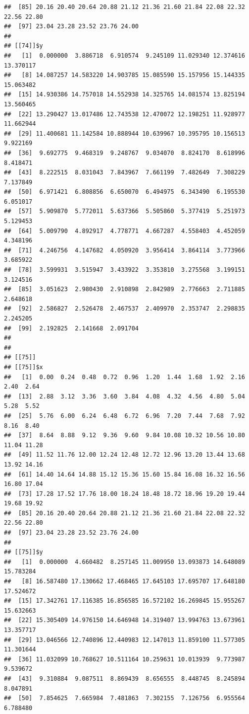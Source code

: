 \documentclass[
  ignorenonframetext,
]{beamer}
\begin{document}
\begin{frame}[fragile]{}
\begin{verbatim}
##  [85] 20.16 20.40 20.64 20.88 21.12 21.36 21.60 21.84 22.08 22.32 22.56 22.80
##  [97] 23.04 23.28 23.52 23.76 24.00
## 
## [[74]]$y
##   [1]  0.000000  3.886718  6.910574  9.245109 11.029340 12.374616 13.370117
##   [8] 14.087257 14.583220 14.903785 15.085590 15.157956 15.144335 15.063482
##  [15] 14.930386 14.757018 14.552938 14.325765 14.081574 13.825194 13.560465
##  [22] 13.290427 13.017486 12.743538 12.470072 12.198251 11.928977 11.662944
##  [29] 11.400681 11.142584 10.888944 10.639967 10.395795 10.156513  9.922169
##  [36]  9.692775  9.468319  9.248767  9.034070  8.824170  8.618996  8.418471
##  [43]  8.222515  8.031043  7.843967  7.661199  7.482649  7.308229  7.137849
##  [50]  6.971421  6.808856  6.650070  6.494975  6.343490  6.195530  6.051017
##  [57]  5.909870  5.772011  5.637366  5.505860  5.377419  5.251973  5.129453
##  [64]  5.009790  4.892917  4.778771  4.667287  4.558403  4.452059  4.348196
##  [71]  4.246756  4.147682  4.050920  3.956414  3.864114  3.773966  3.685922
##  [78]  3.599931  3.515947  3.433922  3.353810  3.275568  3.199151  3.124516
##  [85]  3.051623  2.980430  2.910898  2.842989  2.776663  2.711885  2.648618
##  [92]  2.586827  2.526478  2.467537  2.409970  2.353747  2.298835  2.245205
##  [99]  2.192825  2.141668  2.091704
## 
## 
## [[75]]
## [[75]]$x
##   [1]  0.00  0.24  0.48  0.72  0.96  1.20  1.44  1.68  1.92  2.16  2.40  2.64
##  [13]  2.88  3.12  3.36  3.60  3.84  4.08  4.32  4.56  4.80  5.04  5.28  5.52
##  [25]  5.76  6.00  6.24  6.48  6.72  6.96  7.20  7.44  7.68  7.92  8.16  8.40
##  [37]  8.64  8.88  9.12  9.36  9.60  9.84 10.08 10.32 10.56 10.80 11.04 11.28
##  [49] 11.52 11.76 12.00 12.24 12.48 12.72 12.96 13.20 13.44 13.68 13.92 14.16
##  [61] 14.40 14.64 14.88 15.12 15.36 15.60 15.84 16.08 16.32 16.56 16.80 17.04
##  [73] 17.28 17.52 17.76 18.00 18.24 18.48 18.72 18.96 19.20 19.44 19.68 19.92
##  [85] 20.16 20.40 20.64 20.88 21.12 21.36 21.60 21.84 22.08 22.32 22.56 22.80
##  [97] 23.04 23.28 23.52 23.76 24.00
## 
## [[75]]$y
##   [1]  0.000000  4.660482  8.257145 11.009950 13.093873 14.648089 15.783284
##   [8] 16.587480 17.130662 17.468465 17.645103 17.695707 17.648180 17.524672
##  [15] 17.342761 17.116385 16.856585 16.572102 16.269845 15.955267 15.632663
##  [22] 15.305409 14.976150 14.646948 14.319407 13.994763 13.673961 13.357717
##  [29] 13.046566 12.740896 12.440983 12.147013 11.859100 11.577305 11.301644
##  [36] 11.032099 10.768627 10.511164 10.259631 10.013939  9.773987  9.539672
##  [43]  9.310884  9.087511  8.869439  8.656555  8.448745  8.245894  8.047891
##  [50]  7.854625  7.665984  7.481863  7.302155  7.126756  6.955564  6.788480

\end{verbatim}
\end{frame}
\end{document}

